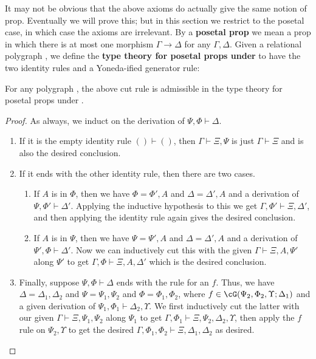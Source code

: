 \documentclass{book}
\let\types\vdash
\begin{document}
It may not be obvious that the above axioms do actually give the same notion of prop.
Eventually we will prove this; but in this section we restrict to the posetal case, in which case the axioms are irrelevant.
By a \textbf{posetal prop} we mean a prop in which there is at most one morphism $\Gamma\to\Delta$ for any $\Gamma,\Delta$.
Given a relational polygraph \cG, we define the \textbf{type theory for posetal props under \cG} to have the two identity rules and a Yoneda-ified generator rule:

\begin{thm}\label{thm:prop-cutadm}
  For any polygraph \cG, the above cut rule is admissible in the type theory for posetal props under \cG.
\end{thm}
\begin{proof}
  As always, we induct on the derivation of $\Psi,\Phi \types \Delta$.
  \begin{enumerate}
  \item If it is the empty identity rule $()\types()$, then $\Gamma\types\Xi,\Psi$ is just $\Gamma\types\Xi$ and is also the desired conclusion.
  \item If it ends with the other identity rule, then there are two cases.
    \begin{enumerate}
    \item If $A$ is in $\Phi$, then we have $\Phi=\Phi',A$ and $\Delta=\Delta',A$ and a derivation of $\Psi,\Phi'\types\Delta'$.
      Applying the inductive hypothesis to this we get $\Gamma,\Phi'\types \Xi,\Delta'$, and then applying the identity rule again gives the desired conclusion.
    \item If $A$ is in $\Psi$, then we have $\Psi=\Psi',A$ and $\Delta=\Delta',A$ and a derivation of $\Psi',\Phi\types\Delta'$.
      Now we can inductively cut this with the given $\Gamma\types \Xi,A,\Psi'$ along $\Psi'$ to get $\Gamma,\Phi\types \Xi,A,\Delta'$ which is the desired conclusion.
    \end{enumerate}
  \item Finally, suppose $\Psi,\Phi \types \Delta$ ends with the rule for an $f$.
    Thus, we have $\Delta=\Delta_1,\Delta_2$ and $\Psi=\Psi_1,\Psi_2$ and $\Phi=\Phi_1,\Phi_2$, where $f\in\cG(\Psi_2,\Phi_2,\Upsilon;\Delta_1)$ and a given derivation of $\Psi_1,\Phi_1\types \Delta_2,\Upsilon$.
    We first inductively cut the latter with our given $\Gamma\types \Xi,\Psi_1,\Psi_2$ along $\Psi_1$ to get $\Gamma,\Phi_1\types \Xi,\Psi_2,\Delta_2,\Upsilon$, then apply the $f$ rule on $\Psi_2,\Upsilon$ to get the desired $\Gamma,\Phi_1,\Phi_2\types \Xi,\Delta_1,\Delta_2$ as desired.\qedhere
  \end{enumerate}
\end{proof}
\end{document}
